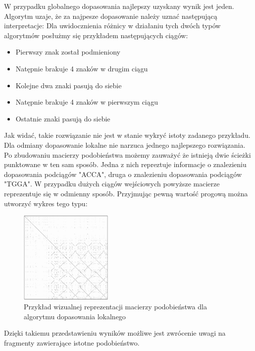 \documentclass[a4paper,12pt]{article}
\newenvironment{lista}{
\begin{itemize}
  \setlength{\itemsep}{1pt}
  \setlength{\parskip}{0pt}
  \setlength{\parsep}{0pt}
}{\end{itemize}}
\begin{document}
W przypadku globalnego dopasowania najlepszy uzyskany wynik jest jeden. Algorytm uzaje, że za najpesze dopasowanie należy uznać następującą interpretacje: 
Dla uwidocznienia różnicy w działaniu tych dwóch typów algorytmów posłużmy się przykładem następujących ciągów:
\begin{lista}
 \item Pierwszy znak został podmieniony
\item Natępnie brakuje 4 znaków w drugim ciągu
\item Kolejne dwa znaki pasują do siebie
\item Natępnie brakuje 4 znaków w pierwszym ciągu
\item Ostatnie znaki pasują do siebie
\end{lista}

Jak widać, takie rozwiązanie nie jest w stanie wykryć istoty zadanego przykładu. Dla odmiany dopasowanie lokalne nie narzuca jednego najlepszego rozwiązania. Po zbudowaniu macierzy podobieństwa możemy zauważyć że istnieją dwie ścieżki punktowane w ten sam sposób. Jedna z nich repreztuje informacje o znalezieniu dopasowania podciągów "ACCA", druga o znalezieniu dopasowania podciągów "TGGA". W przypadku dużych ciągów wejściowych powyższe macierze reprezentuje się w odmienny sposób. Przyjmując pewną wartość progową można utworzyć wykres tego typu:

\begin{figure}[H]
  \vspace{5pt}
  \centering
  \begin{center}
  \includegraphics[width=0.4\textwidth]{images/macierz.png}
  \end{center}
  \caption{Przykład wizualnej reprezentacji macierzy podobieństwa dla algorytmu dopasowania lokalnego}
\end{figure}

Dzięki takiemu przedstawieniu wyników możliwe jest zwrócenie uwagi na fragmenty zawierające istotne podobieństwo. 
\end{document}
